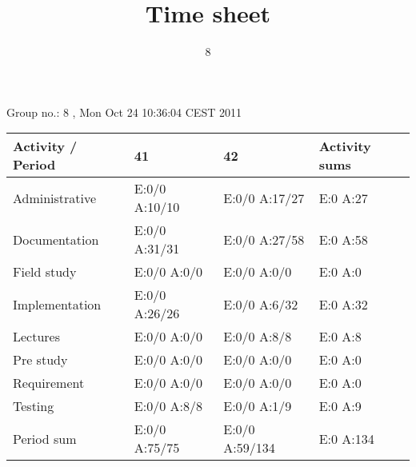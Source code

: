 \documentclass[a4paper]{article}
\title{Time sheet}
\author{8}
\begin{document}
\begin{landscape}
\begin{center}
	Group no.: 8
	, Mon Oct 24 10:36:04 CEST 2011

	\begin{tabular}{| l | l | l | l |}
		\hline
		Activity / Period & 41 & 42 & Activity sums \\
		\hline \hline
		
Administrative & E:0/0 A:10/10 & E:0/0 A:17/27 & E:0 A:27 \\
Documentation & E:0/0 A:31/31 & E:0/0 A:27/58 & E:0 A:58 \\
Field study & E:0/0 A:0/0 & E:0/0 A:0/0 & E:0 A:0 \\
Implementation & E:0/0 A:26/26 & E:0/0 A:6/32 & E:0 A:32 \\
Lectures & E:0/0 A:0/0 & E:0/0 A:8/8 & E:0 A:8 \\
Pre study & E:0/0 A:0/0 & E:0/0 A:0/0 & E:0 A:0 \\
Requirement & E:0/0 A:0/0 & E:0/0 A:0/0 & E:0 A:0 \\
Testing & E:0/0 A:8/8 & E:0/0 A:1/9 & E:0 A:9 \\
Period sum & E:0/0 A:75/75 & E:0/0 A:59/134 & E:0 A:134 \\
		\hline
	\end{tabular}
\end{center}
\end{landscape}
\end{document}
